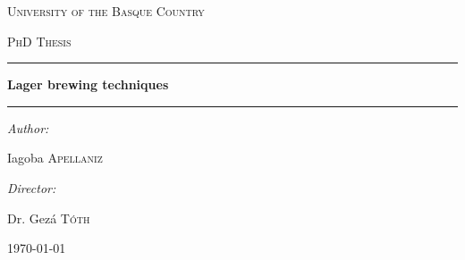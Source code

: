 \begin{titlepage}

\begin{center}

\vspace*{30pt}
\textsc{\LARGE University of the Basque Country}

\vspace{20pt}
\textsc{\Large PhD Thesis}

\vspace{20pt}
\hrule 

\vspace{16pt}
{ \huge \bfseries Lager brewing techniques \\[0.4cm] }

\hrule
\vspace{40pt}

\begin{minipage}{0.4\textwidth}
\begin{flushleft} \large
\emph{Author:}

Iagoba \textsc{Apellaniz}
\end{flushleft}
\end{minipage}
\begin{minipage}{0.4\textwidth}
\begin{flushright} \large
\emph{Director:}

Dr. Gez\'a \textsc{T\'oth}
\end{flushright}
\end{minipage}

\vfill

{\large \today}

\end{center}

\end{titlepage}